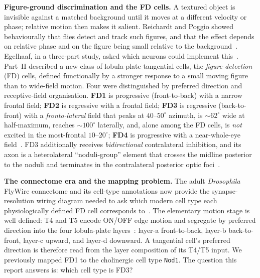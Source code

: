 \documentclass[11pt]{article}
\newcommand{\ttt}[1]{\texttt{#1}}
\begin{document}
\textbf{Figure-ground discrimination and the FD cells.}\quad
A textured object is invisible against a matched background until it moves at a different
velocity or phase; relative motion then makes it salient. Reichardt and Poggio showed
behaviourally that flies detect and track such figures, and that the effect depends on relative
phase and on the figure being small relative to the background~\cite{rp1979}. Egelhaaf, in a three-part
study, asked which neurons could implement this~\cite{egelhaaf1985a,egelhaaf1985b,egelhaaf1985c}.
Part~II described a new class of
lobula-plate tangential cells, the \emph{figure-detection} (FD) cells, defined functionally by a
stronger response to a small moving figure than to wide-field motion. Four were distinguished by
preferred direction and receptive-field organisation. \textbf{FD1} is progressive
(front-to-back) with a narrow frontal field; \textbf{FD2} is regressive with a frontal field;
\textbf{FD3} is regressive (back-to-front) with a \emph{fronto-lateral} field that peaks at
$40$--$50^\circ$ azimuth, is $\sim$$62^\circ$ wide at half-maximum, reaches $\sim$$100^\circ$
laterally, and, alone among the FD cells, is \emph{not} excited in the most-frontal
$10$--$20^\circ$; \textbf{FD4} is progressive with a near-whole-eye field~\cite[p.~202--205]{egelhaaf1985b}.
FD3 additionally receives \emph{bidirectional} contralateral inhibition, and its axon is a
heterolateral ``noduli-group'' element that crosses the midline posterior to the noduli and
terminates in the contralateral posterior optic foci~\cite[p.~203]{egelhaaf1985b}.

\textbf{The connectome era and the mapping problem.}\quad
The adult \emph{Drosophila} FlyWire connectome and its cell-type annotations now provide the
synapse-resolution wiring diagram needed to ask which modern cell type each physiologically
defined FD cell corresponds to~\cite{dorkenwald2024,schlegel2024,codex}. The elementary motion stage is well defined: T4 and T5
encode ON/OFF edge motion and segregate by preferred direction into the four lobula-plate
layers~\cite{maisak2013,fd1989}: layer-a front-to-back, layer-b back-to-front, layer-c upward,
and layer-d downward. A tangential cell's preferred direction is therefore read from the layer composition of its
T4/T5 input. We previously mapped FD1 to the cholinergic cell type \ttt{Nod1}. The question this
report answers is: which cell type is FD3?
\end{document}
